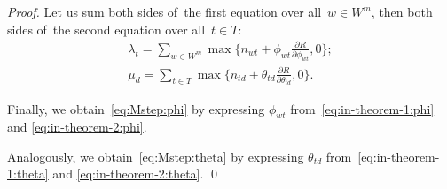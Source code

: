 \documentclass[russian]{llncs}
\begin{document}
\begin{proof}
    Let us sum
    both sides of~the first equation over all~${w\in W^m}$,
    then
    both sides of~the second equation over all~${t\in T}$:
    \begin{gather}
    \label{eq:in-theorem-2:phi}
        \lambda_t
        =
        \sum_{w\in W^m}
        \max\biggl\{
        n_{wt} + \phi_{wt} \frac{\partial R}{\partial \phi_{wt}}, 0
        \biggr\};
    \\
    \label{eq:in-theorem-2:theta}
        \mu_d
        =
        \sum_{t\in T}
        \max\biggl\{
        n_{td} + \theta_{td} \frac{\partial R}{\partial \theta_{td}}, 0
        \biggr\}.
    \end{gather}

    Finally,
    we obtain~\eqref{eq:Mstep:phi} by expressing $\phi_{wt}$ from~\eqref{eq:in-theorem-1:phi} and \eqref{eq:in-theorem-2:phi}.

    Analogously,
    we obtain~\eqref{eq:Mstep:theta} by expressing $\theta_{td}$ from~\eqref{eq:in-theorem-1:theta} and \eqref{eq:in-theorem-2:theta}.
    \qed
\end{proof}
\end{document}
